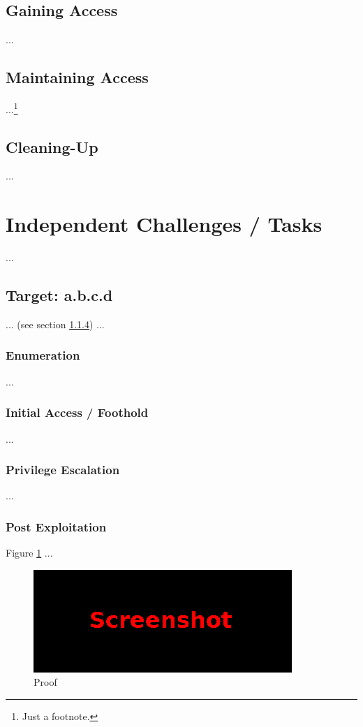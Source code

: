 \subsection{Gaining Access}\label{sec:sec3-gain}
%
...
%
%
%
\subsection{Maintaining Access}\label{sec:sec3-main}
%
...\footnote{Just a footnote.}
%
%
%
\subsection{Cleaning-Up}\label{sec:sec3-clean}
%
...
%
%
%
\section{Independent Challenges / Tasks}\label{sec:sec4}
%
...
%
%
%
\subsection{Target: a.b.c.d}\label{sec:sec4-target1}
%
... (see section \ref{sec:sec4-target1-post}) ...
%
%
%
\subsubsection{Enumeration}\label{sec:sec4-target1-enum}
%
...
%
%
%
\subsubsection{Initial Access / Foothold}\label{sec:sec4-target1-init}
%
...
%
%
%
\subsubsection{Privilege Escalation}\label{sec:sec4-target1-priv}
%
...
%
%
%
\subsubsection{Post Exploitation}\label{sec:sec4-target1-post}
%
Figure \ref{fig:sec4-target1-proof} ...

\begin{figure}[H]
    \centering
    \includegraphics[width=\textwidth]{img/assignment1/screen1.png}
    \caption{Proof}\label{fig:sec4-target1-proof}
\end{figure}
%
%
%
